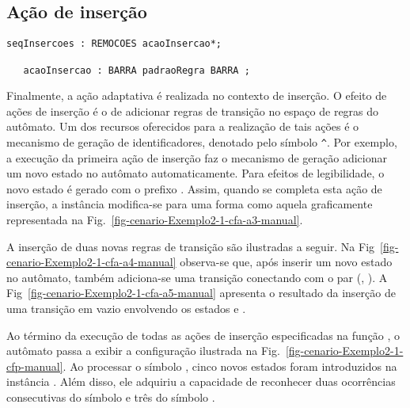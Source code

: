 \subsection*{Ação de inserção}
\label{sec:acao:insercao}

\begin{lstlisting}[style=antlr]
seqInsercoes : REMOCOES acaoInsercao*;

   acaoInsercao : BARRA padraoRegra BARRA ;
\end{lstlisting}

Finalmente, a ação adaptativa  é realizada no contexto de inserção. O efeito de ações de inserção é o de adicionar regras de transição no espaço de regras do autômato. Um dos recursos oferecidos para a realização de tais ações é o mecanismo de geração de identificadores, denotado pelo símbolo \lstinline|^|. Por exemplo, a execução da primeira ação de inserção faz o mecanismo de geração adicionar um novo estado no autômato  automaticamente. Para efeitos de legibilidade, o novo estado é gerado com o prefixo . Assim, quando se completa esta ação de inserção, a instância  modifica-se para uma forma como aquela graficamente representada na Fig.~\ref{fig-cenario-Exemplo2-1-cfa-a3-manual}.



A inserção de duas novas regras de transição são ilustradas a seguir. Na Fig~\ref{fig-cenario-Exemplo2-1-cfa-a4-manual} observa-se que, após inserir um novo estado  no autômato, também adiciona-se uma transição conectando com o par (, ). A Fig~\ref{fig-cenario-Exemplo2-1-cfa-a5-manual} apresenta o resultado da inserção de uma transição em vazio envolvendo os estados  e .


Ao término da execução de todas as ações de inserção especificadas na função , o autômato passa a exibir a configuração ilustrada na Fig.~\ref{fig-cenario-Exemplo2-1-cfp-manual}. Ao processar o símbolo , cinco novos estados foram introduzidos na instância . Além disso, ele adquiriu a capacidade de reconhecer duas ocorrências consecutivas do símbolo  e três do símbolo .

